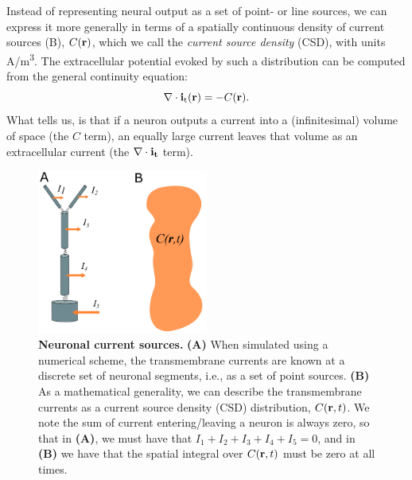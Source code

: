 \section{}
\label{sec:VC:CSD}
Instead of representing neural output as a set of point- or line sources, 
we can express it more generally in terms of a spatially continuous density 
of current sources (B), $C({\bf r})$, 
which we call the \textit{current source density} (CSD), 
with units \si{A/m^3}. 
The extracellular potential evoked by such a distribution can be computed 
from the general continuity equation:
\begin{equation}
\nabla \cdot {\bf i_\mathrm{t}}({\bf r}) = - C({\bf r}).
\label{eq:VC:CSD1}
\end{equation}
What  tells us, is that if a neuron outputs a current into a (infinitesimal) 
volume of space (the $C$ term), an equally large current leaves that volume as an 
extracellular current (the $\nabla \cdot {\bf i_t}$ term).

\begin{figure}[!ht]
\begin{center}
\includegraphics[width=0.5\textwidth]{Figures/VC/CSD.png}
\end{center}
\caption{\textbf{Neuronal current sources.}  
{\bf (A)} When simulated using a numerical scheme, the transmembrane currents 
are known at a discrete set of neuronal segments, i.e., as a set of point sources.  
{\bf (B)} As a mathematical generality, we can describe the transmembrane currents 
as a current source density (CSD) distribution, $C({\bf r},t)$. 
We note the sum of current entering/leaving a neuron is always zero, 
so that in {\bf (A)}, we must have that $I_1 + I_2 + I_3 + I_4 + I_5= 0$, 
and in {\bf (B)} we have that the spatial integral over $C({\bf r},t)$ 
must be zero at all times.
}
\label{fig:VC:CSD}
\end{figure}

